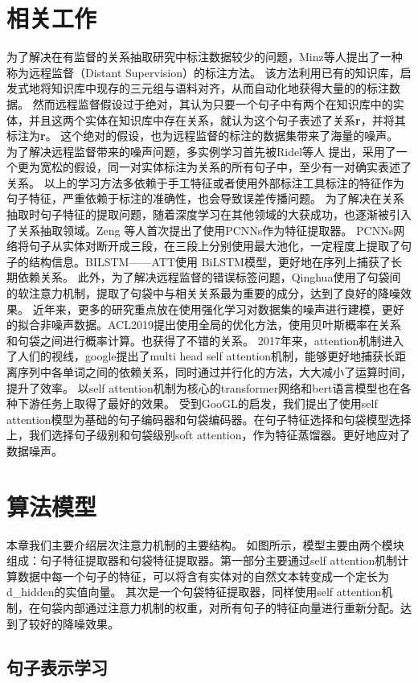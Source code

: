 \documentclass[UTF8]{csoarticle}
\begin{document}
\section{相关工作}
为了解决在有监督的关系抽取研究中标注数据较少的问题，Minz\cite{bib1}等人提出了一种称为远程监督（Distant Supervision）的标注方法。
该方法利用已有的知识库，启发式地将知识库中现存的三元组与语料对齐，从而自动化地获得大量的的标注数据。
然而远程监督假设过于绝对，其认为只要一个句子中有两个在知识库中的实体，并且这两个实体在知识库中存在关系，就认为这个句子表述了关系\textbf{r}，并将其标注为\textbf{r}。
这个绝对的假设，也为远程监督的标注的数据集带来了海量的噪声。
为了解决远程监督带来的噪声问题，多实例学习首先被Ridel等人 \cite{bib2}提出，采用了一个更为宽松的假设，同一对实体标注为关系的所有句子中，至少有一对确实表述了关系。
以上的学习方法多依赖于手工特征或者使用外部标注工具标注的特征作为句子特征，严重依赖于标注的准确性，也会导致误差传播问题。
为了解决在关系抽取时句子特征的提取问题，随着深度学习在其他领域的大获成功，也逐渐被引入了关系抽取领域。Zeng 等人首次提出了使用PCNNs作为特征提取器。
PCNNs网络将句子从实体对断开成三段，在三段上分别使用最大池化，一定程度上提取了句子的结构信息。BILSTM——ATT使用 BiLSTM模型，更好地在序列上捕获了长期依赖关系。
此外，为了解决远程监督的错误标签问题，Qinghua使用了句袋间的软注意力机制，提取了句袋中与相关关系最为重要的成分，达到了良好的降噪效果。
近年来，更多的研究重点放在使用强化学习对数据集的噪声进行建模，更好的拟合非噪声数据。ACL2019提出使用全局的优化方法，使用贝叶斯概率在关系和句袋之间进行概率计算。也获得了不错的关系。
2017年来，attention机制进入了人们的视线，google提出了multi head self attention机制，能够更好地捕获长距离序列中各单词之间的依赖关系，同时通过并行化的方法，大大减小了运算时间，提升了效率。
以self attention机制为核心的transformer网络和bert语言模型也在各种下游任务上取得了最好的效果。
受到GooGL的启发，我们提出了使用self attention模型为基础的句子编码器和句袋编码器。在句子特征选择和句袋模型选择上，我们选择句子级别和句袋级别soft attention，作为特征蒸馏器。更好地应对了数据噪声。
\section{算法模型}
本章我们主要介绍层次注意力机制的主要结构。
如图所示，模型主要由两个模块组成：句子特征提取器和句袋特征提取器。第一部分主要通过self attention机制计算数据中每一个句子的特征，可以将含有实体对的自然文本转变成一个定长为d_hidden的实值向量。
其次是一个句袋特征提取器，同样使用self attention机制，在句袋内部通过注意力机制的权重，对所有句子的特征向量进行重新分配。达到了较好的降噪效果。
\subsection{句子表示学习}
\end{document}
